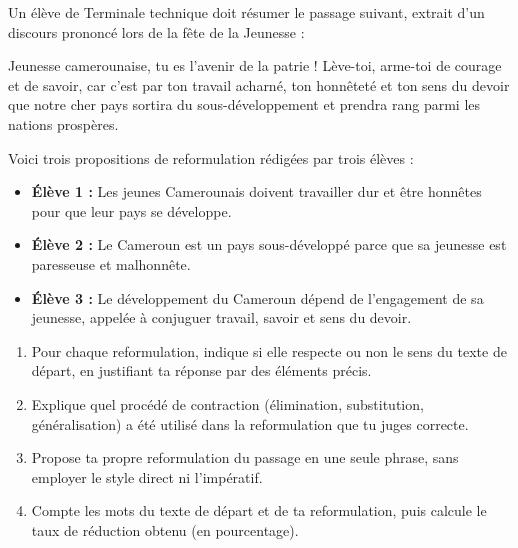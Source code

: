 \documentclass[11pt]{article}
\begin{document}
\begin{exercice}
Un élève de Terminale technique doit résumer le passage suivant, extrait d'un discours prononcé lors de la fête de la Jeunesse :

\og Jeunesse camerounaise, tu es l'avenir de la patrie ! Lève-toi, arme-toi de courage et de savoir, car c'est par ton travail acharné, ton honnêteté et ton sens du devoir que notre cher pays sortira du sous-développement et prendra rang parmi les nations prospères. \fg

Voici trois propositions de reformulation rédigées par trois élèves :

\begin{itemize}
\item \textbf{Élève 1 :} \og Les jeunes Camerounais doivent travailler dur et être honnêtes pour que leur pays se développe. \fg
\item \textbf{Élève 2 :} \og Le Cameroun est un pays sous-développé parce que sa jeunesse est paresseuse et malhonnête. \fg
\item \textbf{Élève 3 :} \og Le développement du Cameroun dépend de l'engagement de sa jeunesse, appelée à conjuguer travail, savoir et sens du devoir. \fg
\end{itemize}

\begin{enumerate}
\item Pour chaque reformulation, indique si elle respecte ou non le sens du texte de départ, en justifiant ta réponse par des éléments précis.
\item Explique quel procédé de contraction (élimination, substitution, généralisation) a été utilisé dans la reformulation que tu juges correcte.
\item Propose ta propre reformulation du passage en une seule phrase, sans employer le style direct ni l'impératif.
\item Compte les mots du texte de départ et de ta reformulation, puis calcule le taux de réduction obtenu (en pourcentage).
\end{enumerate}
\end{exercice}
\end{document}
